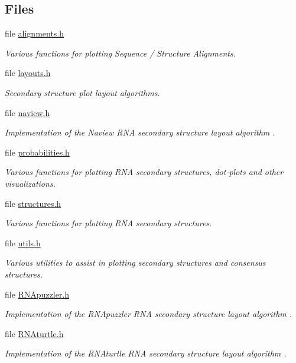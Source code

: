 \subsection*{Files}
\begin{DoxyCompactItemize}
\item 
file \mbox{\hyperlink{plotting_2alignments_8h}{alignments.\+h}}
\begin{DoxyCompactList}\small\item\em Various functions for plotting Sequence / Structure Alignments. \end{DoxyCompactList}\item 
file \mbox{\hyperlink{layouts_8h}{layouts.\+h}}
\begin{DoxyCompactList}\small\item\em Secondary structure plot layout algorithms. \end{DoxyCompactList}\item 
file \mbox{\hyperlink{plotting_2naview_8h}{naview.\+h}}
\begin{DoxyCompactList}\small\item\em Implementation of the Naview R\+NA secondary structure layout algorithm \cite{bruccoleri:1988}. \end{DoxyCompactList}\item 
file \mbox{\hyperlink{probabilities_8h}{probabilities.\+h}}
\begin{DoxyCompactList}\small\item\em Various functions for plotting R\+NA secondary structures, dot-\/plots and other visualizations. \end{DoxyCompactList}\item 
file \mbox{\hyperlink{plotting_2structures_8h}{structures.\+h}}
\begin{DoxyCompactList}\small\item\em Various functions for plotting R\+NA secondary structures. \end{DoxyCompactList}\item 
file \mbox{\hyperlink{plotting_2utils_8h}{utils.\+h}}
\begin{DoxyCompactList}\small\item\em Various utilities to assist in plotting secondary structures and consensus structures. \end{DoxyCompactList}\item 
file \mbox{\hyperlink{RNApuzzler_8h}{R\+N\+Apuzzler.\+h}}
\begin{DoxyCompactList}\small\item\em Implementation of the R\+N\+Apuzzler R\+NA secondary structure layout algorithm \cite{wiegreffe:2018}. \end{DoxyCompactList}\item 
file \mbox{\hyperlink{RNAturtle_8h}{R\+N\+Aturtle.\+h}}
\begin{DoxyCompactList}\small\item\em Implementation of the R\+N\+Aturtle R\+NA secondary structure layout algorithm \cite{wiegreffe:2018}. \end{DoxyCompactList}\end{DoxyCompactItemize}
